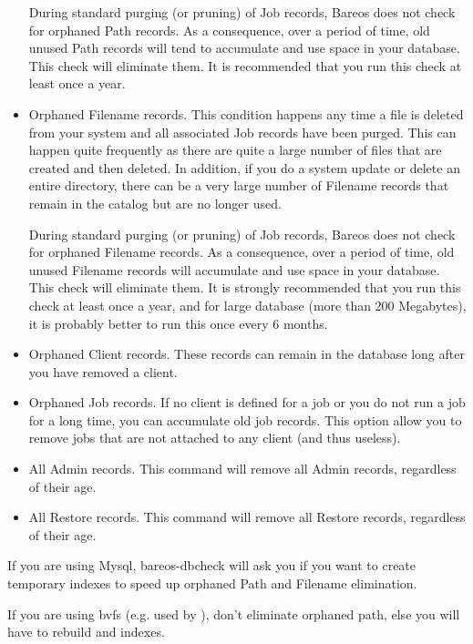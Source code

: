 \begin{itemize}
   During standard purging (or pruning) of Job records, Bareos does  not check
   for orphaned Path records. As a consequence, over a period  of time, old
   unused Path records will tend to accumulate and use  space in your database.
   This check will eliminate them. It is recommended that you run this
   check at least once a year.
\item Orphaned Filename records. This condition happens any time a file is
   deleted from your system and all associated Job records have been purged.
   This can happen quite frequently as there are quite a large number  of files
   that are created and then deleted. In addition, if you  do a system update or
   delete an entire directory, there can be  a very large number of Filename
   records that remain in the catalog  but are no longer used.

   During standard purging (or pruning) of Job records, Bareos does  not check
   for orphaned Filename records. As a consequence, over a period  of time, old
   unused Filename records will accumulate and use  space in your database. This
   check will eliminate them. It is strongly  recommended that you run this check
   at least once a year, and for  large database (more than 200 Megabytes), it is
   probably better to  run this once every 6 months.
\item Orphaned Client records. These records can remain in the database  long
   after you have removed a client.
\item Orphaned Job records. If no client is defined for a job or you  do not
   run a job for a long time, you can accumulate old job  records. This option
   allow you to remove jobs that are not  attached to any client (and thus
   useless).
\item All Admin records. This command will remove all Admin records,
   regardless of their age.
\item All Restore records. This command will remove all Restore records,
   regardless of their age.
\end{itemize}


If you are using Mysql, bareos-dbcheck will ask you if you want to create temporary
indexes to speed up orphaned Path and Filename elimination.

If you are using bvfs (e.g. used by ), don't eliminate orphaned path, else you will
have to rebuild  and
 indexes.

